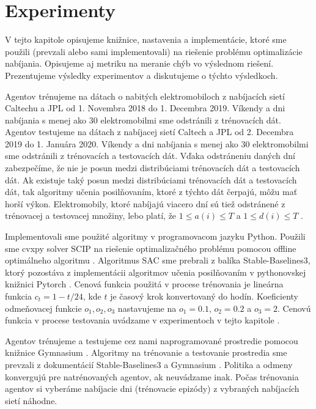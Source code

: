 \chapter{Experimenty}
\label{chapter:experimenty}
V tejto kapitole opisujeme knižnice, nastavenia a implementácie, ktoré sme použili (prevzali alebo sami implementovali) na riešenie problému optimalizácie nabíjania. Opisujeme aj metriku na meranie chýb vo výslednom riešení. Prezentujeme výsledky experimentov a diskutujeme o týchto výsledkoch.


Agentov trénujeme na dátach o nabitých elektromobiloch z nabíjacích sietí Caltechu a JPL od 1. Novembra 2018 do 1. Decembra 2019. Víkendy a dni nabíjania s menej ako 30 elektromobilmi sme odstránili z trénovacích dát. 
Agentov testujeme na dátach z nabíjacej sietí Caltech a JPL od 2. Decembra 2019 do 1. Januára 2020. Víkendy a dni nabíjania s menej ako 30 elektromobilmi sme odstránili z trénovacích a testovacích dát. Vďaka odstráneniu daných dní zabezpečíme, že nie je posun medzi distribúciami trénovacích dát a testovacích dát. Ak existuje taký posun medzi distribúciami trénovacích dát a testovacích dát, tak algoritmy učenia posilňovaním, ktoré z týchto dát čerpajú, môžu mať horší výkon. Elektromobily, ktoré nabíjajú viacero dní sú tiež odstránené z trénovacej a testovacej množiny, lebo platí, že $1 \leq a(i)\leq T$ a $1 \leq d(i)\leq T$  \cite{Li_2021, Li_information_aggregation,li-presentation-rl-problems}.

Implementovali sme použité algoritmy v programovacom jazyku Python. Použili sme cvxpy solver SCIP na riešenie optimalizačného problému pomocou offline optimálneho algoritmu \cite{agrawal2018rewriting,diamond2016cvxpy}. Algoritmus SAC sme prebrali z balíka Stable-Baselines3, ktorý pozostáva z implementácii algoritmov učenia posilňovaním v pythonovskej knižnici Pytorch \cite{li-ppc-presentation-information-aggregation,stable-baselines3}.
Cenová funkcia použitá v procese trénovania je lineárna funkcia $c_{t} = 1 - t/24$, kde $t$ je časový krok konvertovaný do hodín. Koeficienty odmeňovacej funkcie $o_{1}, o_{2}, o_{3}$ nastavujeme na $o_{1} = 0.1$, $o_{2} = 0.2$ a $o_{3} = 2$. Cenovú funkcia v procese testovania uvádzame v experimentoch v tejto kapitole \cite{Li_2021}.

Agentov trénujeme a testujeme cez nami naprogramované prostredie pomocou knižnice Gymnasium \cite{towers2024gymnasium}. Algoritmy na trénovanie a testovanie prostredia sme prevzali z dokumentácií Stable-Baselines3 \cite{stable-baselines3} a Gymnasium \cite{towers2024gymnasium}.
Politika a odmeny konvergujú pre natrénovaných agentov, ak neuvádzame inak. Počas trénovania agentov si vyberáme nabíjacie dni (trénovacie epizódy) z vybraných nabíjacích sietí náhodne. 

